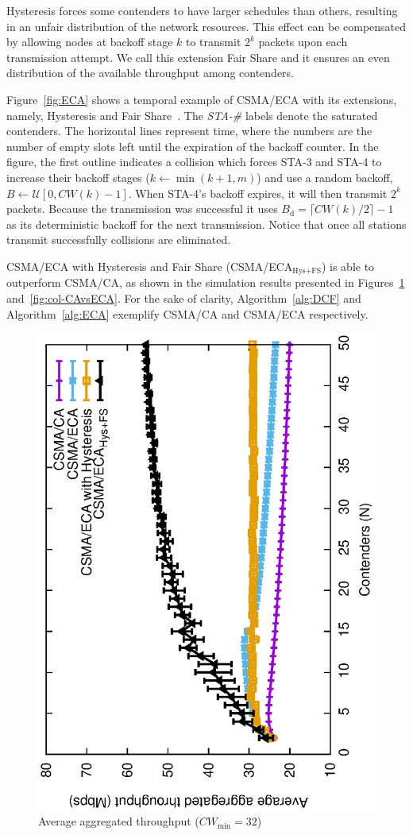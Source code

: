 Hysteresis forces some contenders to have larger schedules than others, resulting in an unfair distribution of the network resources. This effect can be compensated by allowing nodes at backoff stage $k$ to transmit $2^{k}$ packets upon each transmission attempt. We call this extension Fair Share and it ensures an even distribution of the available throughput among contenders.

Figure~\ref{fig:ECA} shows a temporal example of CSMA/ECA with its extensions, namely, Hysteresis and Fair Share~\cite{sanabria2014high}. The \emph{STA-\#} labels denote the saturated contenders. The horizontal lines represent time, where the numbers are the number of empty slots left until the expiration of the backoff counter. In the figure, the first outline indicates a collision which forces STA-3 and STA-4 to increase their backoff stages ($k \leftarrow \min(k+1,m)$) and use a random backoff, $B\leftarrow\mathcal{U}[0,CW(k)-1]$. When STA-4's backoff expires, it will then transmit $2^{k}$ packets. Because the transmission was successful it uses $B_{\text{d}}=\lceil CW(k)/2\rceil-1$ as its deterministic backoff for the next transmission. Notice that once all stations transmit successfully collisions are eliminated.

CSMA/ECA with Hysteresis and Fair Share (CSMA/ECA$_{\text{Hys+FS}}$) is able to outperform CSMA/CA, as shown in the simulation results presented in Figures~\ref{fig:CAvsECA} and~\ref{fig:col-CAvsECA}. For the sake of clarity, Algorithm~\ref{alg:DCF} and Algorithm~\ref{alg:ECA} exemplify CSMA/CA and CSMA/ECA respectively.

	\begin{figure}[tb]
	\centering
		\includegraphics[width=0.7\linewidth, angle=-90]{figures/throughput-perfectChannel.eps}
		\caption{Average aggregated throughput ($CW_{\min}=32$)\cite{sanabria2014high}}
		\label{fig:CAvsECA}
	\end{figure}
	

